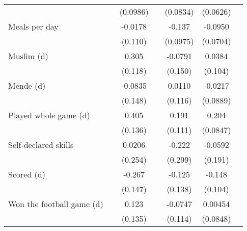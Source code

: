 {\begin{tabularx}{\textwidth}{Xl*{5}{c}}
                    &                     &    (0.0986)         &                     &    (0.0834)         &    (0.0626)         \\
[0.5em]
Meals per day       &                     &     -0.0178         &                     &      -0.137         &     -0.0950         \\
                    &                     &     (0.110)         &                     &    (0.0975)         &    (0.0704)         \\
[0.5em]
Muslim (d)          &                     &       0.305\sym{***}&                     &     -0.0791         &      0.0384         \\
                    &                     &     (0.118)         &                     &     (0.150)         &     (0.104)         \\
[0.5em]
Mende (d)           &                     &     -0.0835         &                     &      0.0110         &     -0.0217         \\
                    &                     &     (0.148)         &                     &     (0.116)         &    (0.0889)         \\
[0.5em]
Played whole game (d)&                     &       0.405\sym{***}&                     &       0.191\sym{*}  &       0.204\sym{**} \\
                    &                     &     (0.136)         &                     &     (0.111)         &    (0.0847)         \\
[0.5em]
Self-declared skills&                     &      0.0206         &                     &      -0.222         &     -0.0592         \\
                    &                     &     (0.254)         &                     &     (0.299)         &     (0.191)         \\
[0.5em]
Scored (d)          &                     &      -0.267\sym{*}  &                     &      -0.125         &      -0.148         \\
                    &                     &     (0.147)         &                     &     (0.138)         &     (0.104)         \\
[0.5em]
Won the football game (d)&                     &       0.123         &                     &     -0.0747         &     0.00454         \\
                    &                     &     (0.135)         &                     &     (0.114)         &    (0.0848)         \\

\end{tabularx}}
